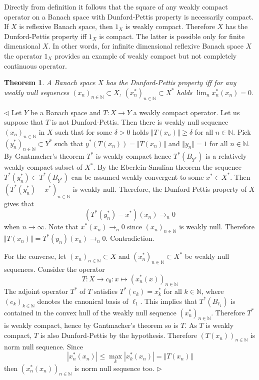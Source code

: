 \documentclass[12pt]{article}
\newtheorem{theorem}{Theorem}[section]
\newenvironment{proof}{\par $\triangleleft$}{$\triangleright$}
\begin{document}
Directly from definition it follows that the square of any weakly compact
operator on a Banach space with Dunford-Pettis property is necessarily compact.
If $X$ is reflexive Banach space, then $1_X$ is weakly compact. Therefore $X$
has the  Dunford-Pettis property iff $1_X$ is compact. The latter is possible
only for finite dimensional $X$. In other words, for infinite dimensional
reflexive Banach space $X$ the operator $1_X$ provides an example of weakly
compact but not completely continuous operator.

\begin{theorem} A Banach space $X$ has the Dunford-Pettis property iff for any
    weakly null sequences ${(x_n)}_{n\in\mathbb{N}}\subset X$,
    ${(x_n^*)}_{n\in\mathbb{N}}\subset X^*$ holds $\lim_n x_n^*(x_n)=0$.
\end{theorem}
\begin{proof} Let $Y$ be a Banach space and $T:X\to Y$ a weakly compact
    operator. Let us suppose that $T$ is not Dunford-Pettis. Then there is
    weakly null sequence ${(x_n)}_{n\in\mathbb{N}}$ in $X$ such that for some
    $\delta>0$ holds $\Vert T(x_n)\Vert\geq \delta$ for all $n\in\mathbb{N}$.
    Pick ${(y_n^*)}_{n\in\mathbb{N}}\subset Y^*$ such that $y^*(T(x_n))=\Vert
        T(x_n)\Vert$ and $\Vert y_n\Vert=1$ for all $n\in\mathbb{N}$. By
    Gantmacher’s theorem $T^*$ is weakly compact hence $T^*(B_{Y^*})$ is a
    relatively weakly compact subset of $X^*$. By the Eberlein-Smulian theorem
    the sequence $T^*(y_n^*)\subset T^*(B_{Y^*})$ can be assumed weakly
    convergent to some $x^*\in X^*$. Then ${(T^*(y_n^*)-x^*)}_{n\in\mathbb{N}}$ is
    weakly null. Therefore, the Dunford-Pettis property of $X$ gives that
    $$
        (T^*(y_n^*)-x^*)(x_n)\to_n 0
    $$
    when $n\to\infty$. Note that $x^*(x_n)\to_n 0$ since
    ${(x_n)}_{n\in\mathbb{N}}$ is weakly null. Therefore $\Vert
        T(x_n)\Vert=T^*(y_n)(x_n)\to_n 0$. Contradiction.

    For the converse, let ${(x_n)}_{n\in\mathbb{N}}\subset X$ and
    ${(x_n^*)}_{n\in\mathbb{N}}\subset X^*$ be weakly null sequences.
    Consider the operator
    $$
        T:X \to c_0: x\mapsto {(x_n^*(x))}_{n\in\mathbb{N}}
    $$
    The adjoint operator $T^*$ of $T$ satisfies $T^*(e_k)=x_k^*$ for all
    $k\in\mathbb{N}$, where ${(e_k)}_{k\in\mathbb{N}}$ denotes the canonical basis
    of $\ell_1$. This implies that $T^*(B_{\ell_1})$ is contained in the convex
    hull of the weakly null sequence ${(x_n^*)}_{n\in\mathbb{N}}$. Therefore $T^*$
    is weakly compact, hence by Gantmacher’s theorem so is $T$. As $T$ is weakly
    compact, $T$ is also Dunford-Pettis by the hypothesis. Therefore
    ${(T(x_n))}_{n\in\mathbb{N}}$ is norm null sequence. Since
    $$
        |x_n^*(x_n)|\leq\max_k |x_k^*(x_n)|=\Vert T(x_n)\Vert
    $$
    then ${(x_n^*(x_n))}_{n\in\mathbb{N}}$ is norm null sequence too.
\end{proof}
\end{document}
